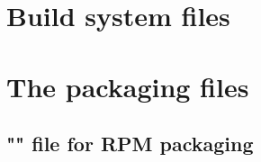 
\chapter{Build system files}

\clearpage


\newpage



\chapter{The packaging files}

\clearpage

\section{"" file for RPM packaging}
\label{spec}
\vspace{-1cm}
